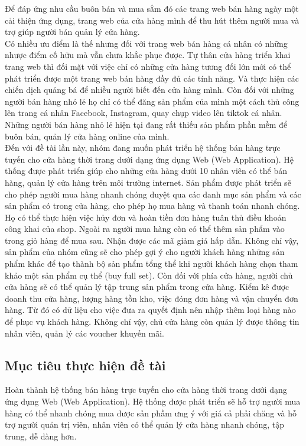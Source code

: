 Để đáp ứng nhu cầu buôn bán và mua sắm đó các trang web bán hàng ngày một cải thiện ứng dụng, trang web của cửa hàng mình để thu hút thêm người mua và trợ giúp người bán quản lý cửa hàng.\\

Có nhiều ưu điểm là thế nhưng đối với trang web bán hàng cá nhân có những nhược điểm cố hữu mà vẫn chưa khắc phục được. Tự thân cửa hàng triển khai trang web thì đối mặt với việc chỉ có những cửa hàng tương đối lớn mới có thể phát triển được một trang web bán hàng đầy đủ các tính năng. Và thực hiện các chiến dịch quảng bá để nhiều người biết đến cửa hàng mình. Còn đối với những người bán hàng nhỏ lẻ họ chỉ có thể đăng sản phẩm của mình một cách thủ công lên trang cá nhân Facebook, Instagram, quay chụp video lên tiktok cá nhân. Những người bán hàng nhỏ lẻ hiện tại đang rất thiếu sản phẩm phần mềm để buôn bán, quản lý cửa hàng online của mình. \\

Đến với đề tài lần này, nhóm đang muốn phát triển hệ thống bán hàng trực tuyến cho cửa hàng thời trang dưới dạng ứng dụng Web (Web Application). Hệ thống được phát triển giúp cho những cửa hàng dưới 10 nhân viên có thể bán hàng, quản lý cửa hàng trên môi trường internet. Sản phẩm được phát triển sẽ cho phép người mua hàng nhanh chóng duyệt qua các danh mục sản phẩm và các sản phẩm có trong cửa hàng, cho phép họ mua hàng và thanh toán nhanh chóng. Họ có thể thực hiện việc hủy đơn và hoàn tiền đơn hàng tuân thủ điều khoản công khai của shop. Ngoài ra người mua hàng còn có thể thêm sản phẩm vào trong giỏ hàng để mua sau. Nhận được các mã giảm giá hấp dẫn. Không chỉ vậy, sản phẩm của nhóm cũng sẽ cho phép gợi ý cho người khách hàng những sản phẩm khác để tạo thành bộ sản phẩm tổng thể khi người khách hàng chọn tham khảo một sản phẩm cụ thể (buy full set). Còn đối với phía cửa hàng, người chủ cửa hàng sẽ có thể quản lý tập trung sản phẩm trong cửa hàng. Kiểm kê được doanh thu cửa hàng, lượng hàng tồn kho, việc đóng đơn hàng và vận chuyển đơn hàng. Từ đó có dữ liệu cho việc đưa ra quyết định nên nhập thêm loại hàng nào để phục vụ khách hàng. Không chỉ vậy, chủ cửa hàng còn quản lý được thông tin nhân viên, quản lý các voucher khuyến mãi.

\subsection{Mục tiêu thực hiện đề tài}

Hoàn thành hệ thống bán hàng trực tuyến cho cửa hàng thời trang dưới dạng ứng dụng Web (Web Application). Hệ thống được phát triển sẽ hỗ trợ người mua hàng có thể nhanh chóng mua được sản phầm ưng ý với giá cả phải chăng và hỗ trợ người quản trị viên, nhân viên có thể quản lý cửa hàng nhanh chóng, tập trung, dễ dàng hơn.

